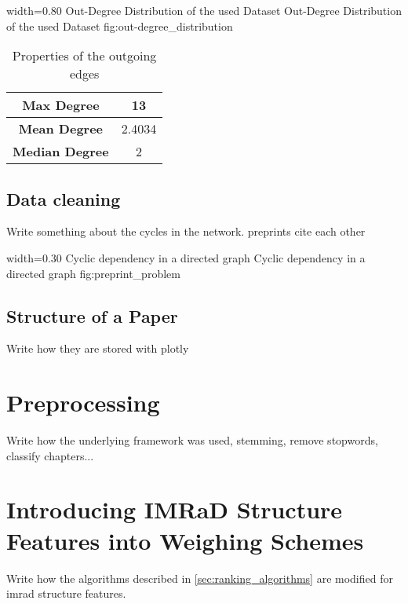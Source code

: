       {width=0.80\textwidth}
      {Out-Degree Distribution of the used Dataset}
      {Out-Degree Distribution of the used Dataset}
      {fig:out-degree_distribution}

\begin{table}
  \centering
  \begin{tabular}{ | c | c | }
    \hline
    \textbf{Max Degree} & 13 \\ \hline
    \textbf{Mean Degree} & 2.4034 \\ \hline
    \textbf{Median Degree} & 2 \\ \hline
  \end{tabular}
  \caption[Properties of the outgoing edges in the used dataset]{Properties of the outgoing edges}
  \label{tbl:properties_outgoing_edges}
\end{table}

\subsection{Data cleaning}
\label{subsec:data_cleaning}
Write something about the cycles in the network. preprints cite each other

      {width=0.30\textwidth}
      {Cyclic dependency in a directed graph}
      {Cyclic dependency in a directed graph}
      {fig:preprint_problem}

\subsection{Structure of a Paper}
\label{sec:analysis}
Write how they are stored with plotly


\section{Preprocessing}
\label{sec:preprocessing}

Write how the underlying framework was used, stemming, remove stopwords, classify chapters...

\section{Introducing IMRaD Structure Features into Weighing Schemes}

Write how the algorithms described in \cref{sec:ranking_algorithms} are modified for imrad structure features.

